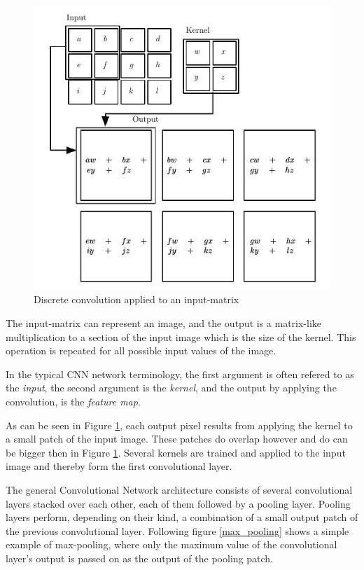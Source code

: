 \documentclass[	DIV=calc,%
				paper=a4,%
				fontsize=11pt,%
				twocolumn]{scrartcl}	 %
\begin{document}
\begin{figure}[H]
    \centering
    \includegraphics[width=.9\linewidth]{data/2d_cnn.png}
    \caption{Discrete convolution applied to an input-matrix}
    \label{2d_cnn}
\end{figure}

The input-matrix can represent an image, and the output is a matrix-like multiplication to a section of the input image which is the size of the kernel. This operation is repeated for all possible input values of the image.

In the typical CNN network terminology, the first argument is often refered to as the \textit{input}, the second argument is the \textit{kernel}, and the output by applying the convolution, is the \textit{feature map}.

As can be seen in Figure \ref{2d_cnn}, each output pixel results from applying the kernel to a small patch of the input image. These patches do overlap however and do can be bigger then in Figure \ref{2d_cnn}. Several kernels are trained and applied to the input image and thereby form the first convolutional layer.

The general Convolutional Network architecture consists of several convolutional layers stacked over each other, each of them followed by a pooling layer. Pooling layers perform, depending on their kind, a combination of a small output patch of the previous convolutional layer. Following figure \ref{max_pooling} shows a simple example of max-pooling, where only the maximum value of the convolutional layer's output is passed on as the output of the pooling patch.
\end{document}
